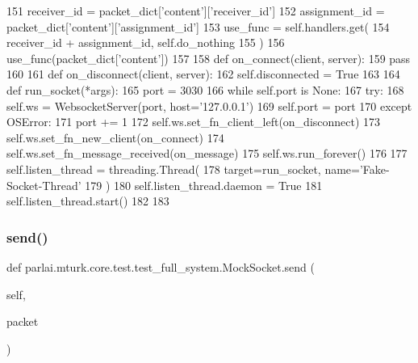\begin{DoxyCode}
151                 receiver\_id = packet\_dict[\textcolor{stringliteral}{'content'}][\textcolor{stringliteral}{'receiver\_id'}]
152                 assignment\_id = packet\_dict[\textcolor{stringliteral}{'content'}][\textcolor{stringliteral}{'assignment\_id'}]
153                 use\_func = self.handlers.get(
154                     receiver\_id + assignment\_id, self.do\_nothing
155                 )
156                 use\_func(packet\_dict[\textcolor{stringliteral}{'content'}])
157 
158         \textcolor{keyword}{def }on\_connect(client, server):
159             \textcolor{keywordflow}{pass}
160 
161         \textcolor{keyword}{def }on\_disconnect(client, server):
162             self.disconnected = \textcolor{keyword}{True}
163 
164         \textcolor{keyword}{def }run\_socket(*args):
165             port = 3030
166             \textcolor{keywordflow}{while} self.port \textcolor{keywordflow}{is} \textcolor{keywordtype}{None}:
167                 \textcolor{keywordflow}{try}:
168                     self.ws = WebsocketServer(port, host=\textcolor{stringliteral}{'127.0.0.1'})
169                     self.port = port
170                 \textcolor{keywordflow}{except} OSError:
171                     port += 1
172             self.ws.set\_fn\_client\_left(on\_disconnect)
173             self.ws.set\_fn\_new\_client(on\_connect)
174             self.ws.set\_fn\_message\_received(on\_message)
175             self.ws.run\_forever()
176 
177         self.listen\_thread = threading.Thread(
178             target=run\_socket, name=\textcolor{stringliteral}{'Fake-Socket-Thread'}
179         )
180         self.listen\_thread.daemon = \textcolor{keyword}{True}
181         self.listen\_thread.start()
182 
183 
\end{DoxyCode}
\mbox{\label{classparlai_1_1mturk_1_1core_1_1test_1_1test__full__system_1_1MockSocket_adfde729d82337cbb4bd1757c18fe92f6}} 
\subsubsection{\texorpdfstring{send()}{send()}}
{\footnotesize\ttfamily def parlai.\+mturk.\+core.\+test.\+test\+\_\+full\+\_\+system.\+Mock\+Socket.\+send (\begin{DoxyParamCaption}\item[{}]{self,  }\item[{}]{packet }\end{DoxyParamCaption})}



